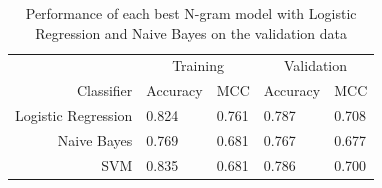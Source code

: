 \begin{table}[h]
  \begin{center}
  \begin{tabular}{ r | *2l | *2l }
    \toprule
     & \multicolumn{2}{c|}{Training} & \multicolumn{2}{|c}{Validation}\\
    Classifier & Accuracy & MCC & Accuracy & MCC \\
    \midrule
    Logistic Regression & 0.824 & 0.761 & 0.787 & 0.708 \\
    Naive Bayes         & 0.769 & 0.681 & 0.767 & 0.677 \\
    SVM                 & 0.835 & 0.681 & 0.786 & 0.700 \\
    \bottomrule
  \end{tabular}
  \caption{Performance of each best N-gram model with Logistic Regression and Naive Bayes on the validation data}
\label{tab:Ngram Grid Search Scores}
\end{center}
\end{table}

